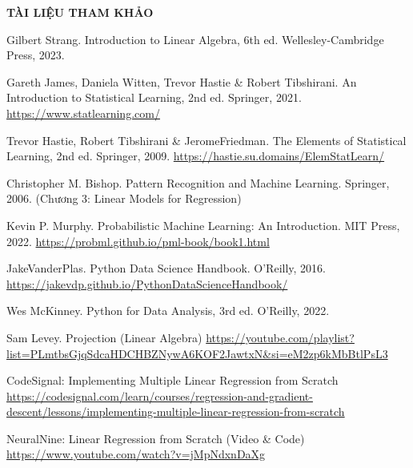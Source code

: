 \newpage
\thispagestyle{empty}

\begin{center}
    {\Large\bfseries\color{central_blue} TÀI LIỆU THAM KHẢO}
\end{center}


\begin{enumerate}[label={[{\arabic*}]}]
    \item Gilbert Strang. Introduction to Linear Algebra, 6th ed. Wellesley-Cambridge Press, 2023.
    \item Gareth James, Daniela Witten, Trevor Hastie \& Robert Tibshirani. An Introduction to Statistical Learning, 2nd ed. Springer, 2021. \url{https://www.statlearning.com/}
    \item Trevor Hastie, Robert Tibshirani \& JeromeFriedman. The Elements of Statistical Learning, 2nd ed. Springer, 2009. \url{https://hastie.su.domains/ElemStatLearn/}
    \item Christopher M. Bishop. Pattern Recognition and Machine Learning. Springer, 2006. (Chương 3: Linear Models for Regression)
    \item Kevin P. Murphy. Probabilistic Machine Learning: An Introduction. MIT Press, 2022. \url{https://probml.github.io/pml-book/book1.html}
    \item JakeVanderPlas. Python Data Science Handbook. O'Reilly, 2016. \url{https://jakevdp.github.io/PythonDataScienceHandbook/}
    \item Wes McKinney. Python for Data Analysis, 3rd ed. O'Reilly, 2022.
    \item Sam Levey. Projection (Linear Algebra) \url{https://youtube.com/playlist?list=PLmtbsGjqSdcaHDCHBZNywA6KOF2JawtxN&si=eM2zp6kMbBtlPsL3}
    \item CodeSignal: Implementing Multiple Linear Regression from Scratch \url{https://codesignal.com/learn/courses/regression-and-gradient-descent/lessons/implementing-multiple-linear-regression-from-scratch}
    \item NeuralNine: Linear Regression from Scratch (Video \& Code) \url{https://www.youtube.com/watch?v=jMpNdxnDaXg}
\end{enumerate}
